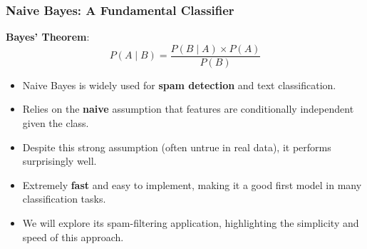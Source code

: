 \documentclass[aspectratio=169]{beamer}
\begin{document}
\begin{frame}
    \frametitle{Naive Bayes: A Fundamental Classifier}
    \textbf{Bayes' Theorem}:
    \[
        P(A \mid B) = \frac{P(B \mid A) \times P(A)}{P(B)}
    \]
    \begin{itemize}
        \item Naive Bayes is widely used for \textbf{spam detection} and text classification.
        \pause
        \item Relies on the \textbf{naive} assumption that features are conditionally independent given the class.
        \pause
        \item Despite this strong assumption (often untrue in real data), it performs surprisingly well.
        \pause
        \item Extremely \textbf{fast} and easy to implement, making it a good first model in many classification tasks.
        \pause
        \item We will explore its spam-filtering application, highlighting the simplicity and speed of this approach.
    \end{itemize}
\end{frame}
\end{document}
